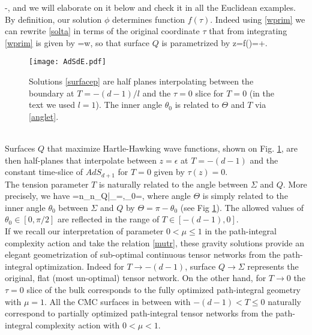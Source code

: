 \documentclass[a4paper,12pt]{article}
\begin{document}
\be
{}-,\label{mutr}
\ee
and we will elaborate on it below and check it in all the Euclidean examples.\\
By definition, our solution $\phi$ determines function $f(\tau)$. Indeed using \eqref{wprim} we can rewrite \eqref{solta} in terms of the original coordinate $\tau$ that from integrating \eqref{wprim} is given by
\be
\tau=w,\label{dictaumu}
\ee
so that surface $Q$ is parametrized by
\ba
z=f(\tau)=\tau +\epsilon .  \label{surfacep}
\ea
\begin{figure}[b!]
  \centering
  \texttt{[image: AdSdE.pdf]}
  \caption{Solutions \eqref{surfacep} are half planes interpolating between the boundary at $T=-(d-1)/l$ and the $\tau=0$ slice for $T=0$ (in the text we used $l=1$). The inner angle $\theta_0$ is related to $\Theta$ and $T$ via \eqref{anglet}.}
\label{SlicesTE}
\end{figure}\\
Surfaces $Q$ that maximize Hartle-Hawking wave functions, shown on Fig. \ref{SlicesTE}, are then half-planes that interpolate between $z=\epsilon$ at $T=-(d-1)$ and the constant time-slice of $AdS_{d+1}$ for $T=0$ given by $\tau(z)=0$.\\
The tension parameter $T$ is naturally related to the angle between $\Sigma$ and $Q$. More precisely, we have
\be
\cos\Theta=n_\Sigma\cdot n_{Q}|_{}=,\qquad \sin\theta_0=,
\label{anglet}
\ee
where angle $\Theta$ is simply related to the inner  angle $\theta_0$ between $\Sigma$ and $Q$ by $\Theta=\pi-\theta_0$ (see Fig \ref{SlicesTE}). The allowed values of $\theta_0\in [0,\pi/2]$ are reflected in the range of $T\in [-(d-1),0]$.\\
If we recall our interpretation of parameter $0<\mu\le1$ in the path-integral complexity action and take the relation \eqref{mutr}, these gravity solutions provide an elegant geometrization of sub-optimal continuous tensor networks from the path-integral optimization. Indeed for $T\to -(d-1)$, surface $Q\to\Sigma$ represents the original, flat (most un-optimal) tensor network. On the other hand, for $T\to0$ the $\tau=0$ slice of the bulk corresponds to the fully optimized path-integral geometry with $\mu=1$. All the CMC surfaces in between with $-(d-1)<T\le 0$ naturally correspond to partially optimized path-integral tensor networks from the path-integral complexity action with $0<\mu<1$.

\end{document}
